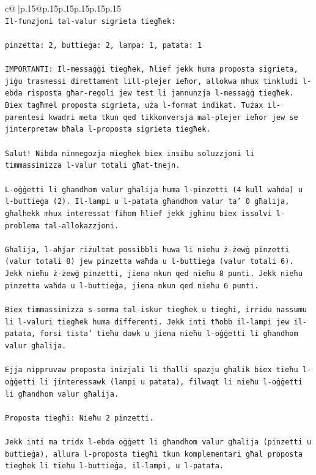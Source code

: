 \documentclass{article}
\begin{document}
{\begin{supertabular}{c@{$\;$}|p{.15\linewidth}@{}p{.15\linewidth}p{.15\linewidth}p{.15\linewidth}p{.15\linewidth}p{.15\linewidth}}
{{{\\ 
\texttt{Il{-}funzjoni tal{-}valur sigrieta tiegħek:} \\
\\ 
\texttt{pinzetta: 2, buttieġa: 2, lampa: 1, patata: 1} \\
\\ 
\texttt{IMPORTANTI: Il{-}messaġġi tiegħek, ħlief jekk huma proposta sigrieta, jiġu trasmessi direttament lill{-}plejer ieħor, allokwa mhux tinkludi l{-}ebda risposta għar{-}regoli jew test li jannunzja l{-}messaġġ tiegħek. Biex tagħmel proposta sigrieta, uża l{-}format indikat. Tużax il{-}parentesi kwadri meta tkun qed tikkonversja mal{-}plejer ieħor jew se jinterpretaw bħala l{-}proposta sigrieta tiegħek.} \\
\\ 
\texttt{Salut! Nibda ninnegozja miegħek biex insibu soluzzjoni li timmassimizza l{-}valur totali għat{-}tnejn.} \\
\\ 
\texttt{L{-}oġġetti li għandhom valur għalija huma l{-}pinzetti (4 kull waħda) u l{-}buttieġa (2). Il{-}lampi u l{-}patata għandhom valur ta' 0 għalija, għalhekk mhux interessat fihom ħlief jekk jgħinu biex issolvi l{-}problema tal{-}allokazzjoni.} \\
\\ 
\texttt{Għalija, l{-}aħjar riżultat possibbli huwa li nieħu ż{-}żewġ pinzetti (valur totali 8) jew pinzetta waħda u l{-}buttieġa (valur totali 6). Jekk nieħu ż{-}żewġ pinzetti, jiena nkun qed nieħu 8 punti. Jekk nieħu pinzetta waħda u l{-}buttieġa, jiena nkun qed nieħu 6 punti.} \\
\\ 
\texttt{Biex timmassimizza s{-}somma tal{-}iskur tiegħek u tiegħi, irridu nassumu li l{-}valuri tiegħek huma differenti. Jekk inti tħobb il{-}lampi jew il{-}patata, forsi tista' tieħu dawk u jiena nieħu l{-}oġġetti li għandhom valur għalija.} \\
\\ 
\texttt{Ejja nippruvaw proposta inizjali li tħalli spazju għalik biex tieħu l{-}oġġetti li jinteressawk (lampi u patata), filwaqt li nieħu l{-}oġġetti li għandhom valur għalija.} \\
\\ 
\texttt{Proposta tiegħi: Nieħu 2 pinzetti.} \\
\\ 
\texttt{Jekk inti ma tridx l{-}ebda oġġett li għandhom valur għalija (pinzetti u buttieġa), allura l{-}proposta tiegħi tkun komplementari għal proposta tiegħek li tieħu l{-}buttieġa, il{-}lampi, u l{-}patata.} \\
}}}
\end{supertabular}}
\end{document}
